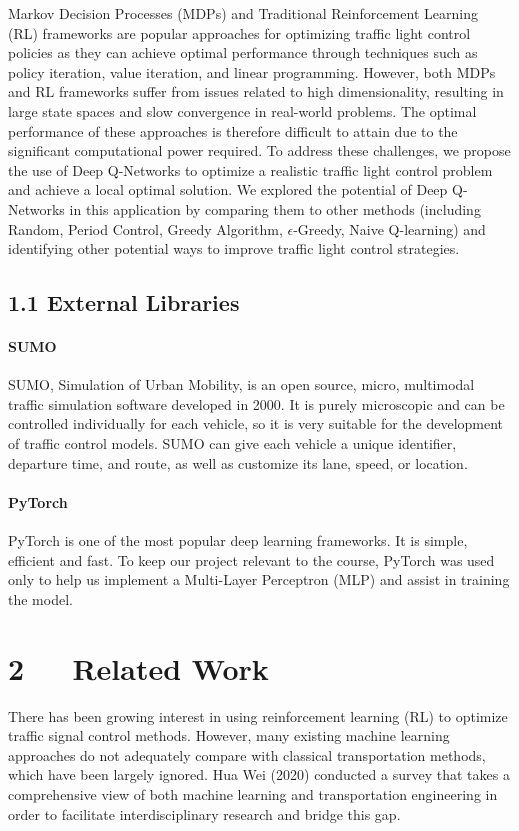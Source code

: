 \documentclass[letterpaper]{article} %
\begin{document}
Markov Decision Processes (MDPs) and Traditional Reinforcement Learning (RL) frameworks are popular approaches for optimizing traffic light control policies as they can achieve optimal performance through techniques such as policy iteration, value iteration, and linear programming. However, both MDPs and RL frameworks suffer from issues related to high dimensionality, resulting in large state spaces and slow convergence in real-world problems. The optimal performance of these approaches is therefore difficult to attain due to the significant computational power required. To address these challenges, we propose the use of Deep Q-Networks to optimize a realistic traffic light control problem and achieve a local optimal solution. We explored the potential of Deep Q-Networks in this application by comparing them to other methods (including Random, Period Control, Greedy Algorithm, $\epsilon$-Greedy, Naive Q-learning) and identifying other potential ways to improve traffic light control strategies.

\subsection{1.1 External Libraries}
\paragraph{SUMO} SUMO, Simulation of Urban Mobility, is an open source, micro, multimodal traffic simulation software developed in 2000. It is purely microscopic and can be controlled individually for each vehicle, so it is very suitable for the development of traffic control models. SUMO can give each vehicle a unique identifier, departure time, and route, as well as customize its lane, speed, or location.

\paragraph{PyTorch} PyTorch is one of the most popular deep learning frameworks. It is simple, efficient and fast. To keep our project relevant to the course, PyTorch was used only to help us implement a Multi-Layer Perceptron (MLP) and assist in training the model.


\section{2\ \ \ Related Work}
\hspace*{1em}There has been growing interest in using reinforcement learning (RL) to optimize traffic signal control methods. However, many existing machine learning approaches do not adequately compare with classical transportation methods, which have been largely ignored. Hua Wei (2020) conducted a survey that takes a comprehensive view of both machine learning and transportation engineering in order to facilitate interdisciplinary research and bridge this gap.
\end{document}
